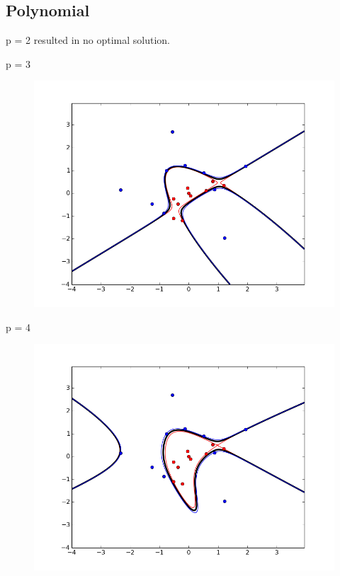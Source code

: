 \documentclass{article}
\begin{document}
\subsection{Polynomial}

p = 2 resulted in no optimal solution.

p = 3
\begin{figure}[H]
    \centering
    \includegraphics[width=1.0\linewidth]{../img/poly_s1_p3.png}
\end{figure}

p = 4
\begin{figure}[H]
    \centering
    \includegraphics[width=1.0\linewidth]{../img/poly_s1_p4.png}
\end{figure}
\end{document}
